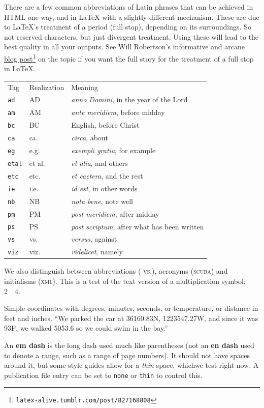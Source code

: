 \documentclass{amsart}
\theoremstyle{plain}%
\theoremstyle{definition}%
\theoremstyle{remark}%
\newcommand{\tabularfont}{\relax}
\newcommand{\mono}[1]{\texttt{#1}}
\newcommand{\initialism}[1]{\textsc{\MakeLowercase{#1}}}
\newcommand{\acronym}[1]{\textsc{\MakeLowercase{#1}}}
\newcommand{\abbreviation}[1]{%
\textsc{\MakeLowercase{#1}}}
\newcommand{\terminology}[1]{\textbf{#1}}
\numberwithin{equation}{section}
\begin{document}
\par
There are a few  common abbreviations of Latin phrases that can be achieved in HTML one way, and in \LaTeX{} with a slightly different mechanism.  These are due to \LaTeX{}'s treatment of a period (full stop), depending on its surroundings.  So not reserved characters, but just divergent treatment.  Using these will lead to the best quality in all your outputs.  See Will Robertson's informative and arcane \href{http://latex-alive.tumblr.com/post/827168808/correct-punctuation-spaces}{blog post}\footnote{\nolinkurl{latex-alive.tumblr.com/post/827168808}\label{section-text-paragraphs-8-10-4}} on the topic if you want the full story for the treatment of a full stop in \LaTeX{}.%
\begin{center}%
{\tabularfont%
\begin{tabular}{lll}
Tag&Realization&Meaning\tabularnewline[0pt]
\mono{ad}&AD&\textit{anno Domini}, in the year of the Lord\tabularnewline[0pt]
\mono{am}&AM&\textit{ante meridiem}, before midday\tabularnewline[0pt]
\mono{bc}&BC&English, before Christ\tabularnewline[0pt]
\mono{ca}&ca.\@&\textit{circa}, about\tabularnewline[0pt]
\mono{eg}&e.g.\@&\textit{exempli gratia}, for example\tabularnewline[0pt]
\mono{etal}&et al.\@&\textit{et alia}, and others\tabularnewline[0pt]
\mono{etc}&etc.\@&\textit{et caetera}, and the rest\tabularnewline[0pt]
\mono{ie}&i.e.\@&\textit{id est}, in other words\tabularnewline[0pt]
\mono{nb}&NB&\textit{nota bene}, note well\tabularnewline[0pt]
\mono{pm}&PM&\textit{post meridiem}, after midday\tabularnewline[0pt]
\mono{ps}&PS&\textit{post scriptum}, after what has been written\tabularnewline[0pt]
\mono{vs}&vs.\@&\textit{versus}, against\tabularnewline[0pt]
\mono{viz}&viz.\@&\textit{videlicet}, namely
\end{tabular}
}%
\end{center}%
We also distinguish between abbreviations (\abbreviation{vs.}), acronyms (\acronym{SCUBA}) and initialisms (\initialism{XML}).  This is a test of the text version of a multiplication symbol: 2~\texttimes{}~4.%
\par
Simple coordinates with degrees, minutes, seconds, or temperature, or distance in feet and inches.  ``We parked the car at 36\textdegree{}16\textquotesingle{}0.83\textquotesingle\textquotesingle{}N, 122\textdegree{}35\textquotesingle{}47.27\textquotesingle\textquotesingle{}W, and since it was 93\textdegree{}F, we walked 505\textquotesingle{}3.6\textquotesingle\textquotesingle{} so we could swim in the bay.''%
\par
An \terminology{em dash} is the long dash used much like parentheses (not an \terminology{en dash} used to denote a range, such as a range of page numbers).  It should not have spaces around it, but some style guides allow for a \emph{thin} space, which\textemdash{}we test right now.  A publication file entry can be set to \mono{none} or \mono{thin} to control this.%
%
%
\typeout{************************************************}
\typeout{************************************************}
%
\end{document}
